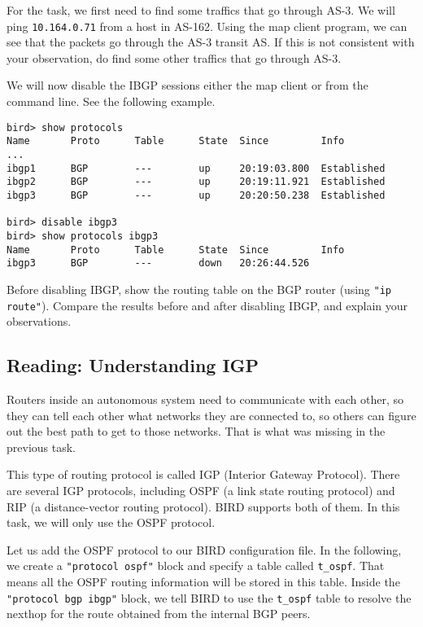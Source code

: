 For the task, we first need to find some traffics that 
go through AS-3. We will ping \texttt{10.164.0.71} from a host in AS-162. Using the 
map client program, we can see that the packets go through
the AS-3 transit AS. If this is not consistent with your observation,
do find some other traffics that go through AS-3. 

We will now disable the IBGP sessions either the map client or 
from the command line. See the following example.

\begin{lstlisting}
bird> show protocols
Name       Proto      Table      State  Since         Info
...
ibgp1      BGP        ---        up     20:19:03.800  Established
ibgp2      BGP        ---        up     20:19:11.921  Established
ibgp3      BGP        ---        up     20:20:50.238  Established

bird> disable ibgp3 
bird> show protocols ibgp3
Name       Proto      Table      State  Since         Info
ibgp3      BGP        ---        down   20:26:44.526
\end{lstlisting}
 
Before disabling IBGP, show the routing table 
on the BGP router (using \texttt{"ip route"}). Compare the 
results before and after disabling IBGP, and explain
your observations. 


\subsection{Reading: Understanding IGP} 

Routers inside an autonomous system need to
communicate with each other, so they can tell each other
what networks they are connected to, so others can figure out
the best path to get to those networks. That is what
was missing in the previous task.


This type of routing protocol is called IGP (Interior Gateway Protocol).
There are several IGP protocols, including OSPF (a link state routing protocol) and RIP (a
distance-vector routing protocol). BIRD supports both of them. In this
task, we will only use the OSPF protocol.

Let us add the OSPF protocol to our BIRD configuration file. In the following,
we create a \texttt{"protocol ospf"} block and specify a table called \texttt{t\_ospf}.
That means all the OSPF routing information will be stored in
this table. Inside the \texttt{"protocol bgp ibgp"} block, we tell BIRD to
use the \texttt{t\_ospf} table to resolve the nexthop for
the route obtained from the internal BGP peers.

